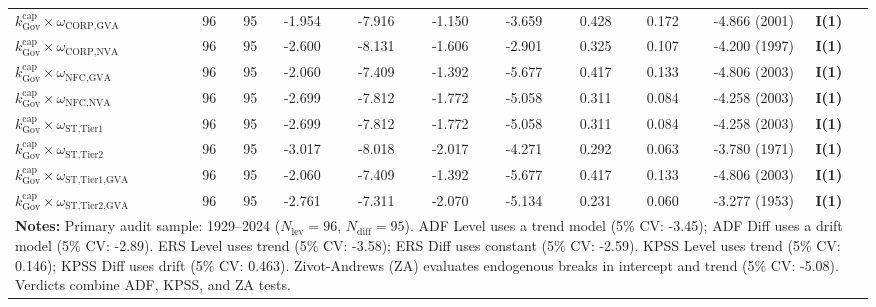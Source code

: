 \begin{table}[H]
\begin{tabular}{p{5.5cm} p{0.5cm} p{0.5cm} p{1.3cm} p{1.3cm} p{1.3cm} p{1.3cm} p{1.3cm} p{1.3cm} p{2.2cm} p{2.2cm}}
$k^{\text{cap}}_{\text{Gov}} \times \omega_{\text{CORP,GVA}}$ & 96 & 95 & -1.954 & -7.916 & -1.150 & -3.659 & 0.428 & 0.172 & -4.866 (2001) & \textbf{I(1)} \\ 
$k^{\text{cap}}_{\text{Gov}} \times \omega_{\text{CORP,NVA}}$ & 96 & 95 & -2.600 & -8.131 & -1.606 & -2.901 & 0.325 & 0.107 & -4.200 (1997) & \textbf{I(1)} \\ 
$k^{\text{cap}}_{\text{Gov}} \times \omega_{\text{NFC,GVA}}$ & 96 & 95 & -2.060 & -7.409 & -1.392 & -5.677 & 0.417 & 0.133 & -4.806 (2003) & \textbf{I(1)} \\ 
$k^{\text{cap}}_{\text{Gov}} \times \omega_{\text{NFC,NVA}}$ & 96 & 95 & -2.699 & -7.812 & -1.772 & -5.058 & 0.311 & 0.084 & -4.258 (2003) & \textbf{I(1)} \\ 
$k^{\text{cap}}_{\text{Gov}} \times \omega_{\text{ST,Tier1}}$ & 96 & 95 & -2.699 & -7.812 & -1.772 & -5.058 & 0.311 & 0.084 & -4.258 (2003) & \textbf{I(1)} \\ 
$k^{\text{cap}}_{\text{Gov}} \times \omega_{\text{ST,Tier2}}$ & 96 & 95 & -3.017 & -8.018 & -2.017 & -4.271 & 0.292 & 0.063 & -3.780 (1971) & \textbf{I(1)} \\ 
$k^{\text{cap}}_{\text{Gov}} \times \omega_{\text{ST,Tier1,GVA}}$ & 96 & 95 & -2.060 & -7.409 & -1.392 & -5.677 & 0.417 & 0.133 & -4.806 (2003) & \textbf{I(1)} \\ 
$k^{\text{cap}}_{\text{Gov}} \times \omega_{\text{ST,Tier2,GVA}}$ & 96 & 95 & -2.761 & -7.311 & -2.070 & -5.134 & 0.231 & 0.060 & -3.277 (1953) & \textbf{I(1)} \\ 
\bottomrule
\multicolumn{11}{p{21.5cm}}{\footnotesize \textbf{Notes:} Primary audit sample: 1929--2024 ($N_{\text{lev}}=96$, $N_{\text{diff}}=95$). ADF Level uses a trend model (5\% CV: -3.45); ADF Diff uses a drift model (5\% CV: -2.89). ERS Level uses trend (5\% CV: -3.58); ERS Diff uses constant (5\% CV: -2.59). KPSS Level uses trend (5\% CV: 0.146); KPSS Diff uses drift (5\% CV: 0.463). Zivot-Andrews (ZA) evaluates endogenous breaks in intercept and trend (5\% CV: -5.08). Verdicts combine ADF, KPSS, and ZA tests.}
\end{tabular}
\end{table}
